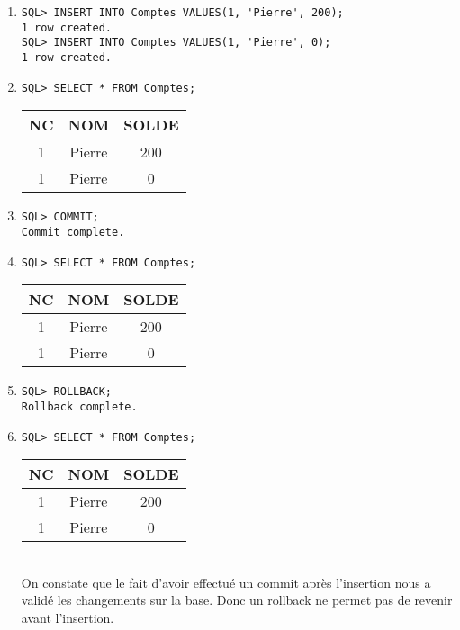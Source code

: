\documentclass{article}
\begin{document}
\begin{enumerate}[label=\arabic*)]
	\item 
		\begin{lstlisting}
SQL> INSERT INTO Comptes VALUES(1, 'Pierre', 200);
1 row created.
SQL> INSERT INTO Comptes VALUES(1, 'Pierre', 0);
1 row created.
		\end{lstlisting}

	\item 
		\begin{lstlisting}
SQL> SELECT * FROM Comptes;
		\end{lstlisting}

\begin{tabular}{|c|c|c|}
	\hline
        	NC & NOM & SOLDE \\
	\hline        
 	1 & Pierre & 200 \\
	\hline         
	1 & Pierre & 0 \\
	\hline
\end{tabular}

	\item 
		\begin{lstlisting}
SQL> COMMIT;
Commit complete.
		\end{lstlisting}

	\item 
		\begin{lstlisting}
SQL> SELECT * FROM Comptes;
		\end{lstlisting}

\begin{tabular}{|c|c|c|}
	\hline
        	NC & NOM & SOLDE \\
	\hline        
 	1 & Pierre & 200 \\
	\hline         
	1 & Pierre & 0 \\
	\hline
\end{tabular}

	\item 
		\begin{lstlisting}
SQL> ROLLBACK;
Rollback complete.
		\end{lstlisting}

	\item 
		\begin{lstlisting}
SQL> SELECT * FROM Comptes;
		\end{lstlisting}

\begin{tabular}{|c|c|c|}
	\hline
        	NC & NOM & SOLDE \\
	\hline        
 	1 & Pierre & 200 \\
	\hline         
	1 & Pierre & 0 \\
	\hline
\end{tabular} \\

On constate que le fait d'avoir effectué un commit après l'insertion nous a validé les changements sur la base. Donc un rollback ne permet pas de revenir avant l'insertion.

\end{enumerate}
\end{document}
